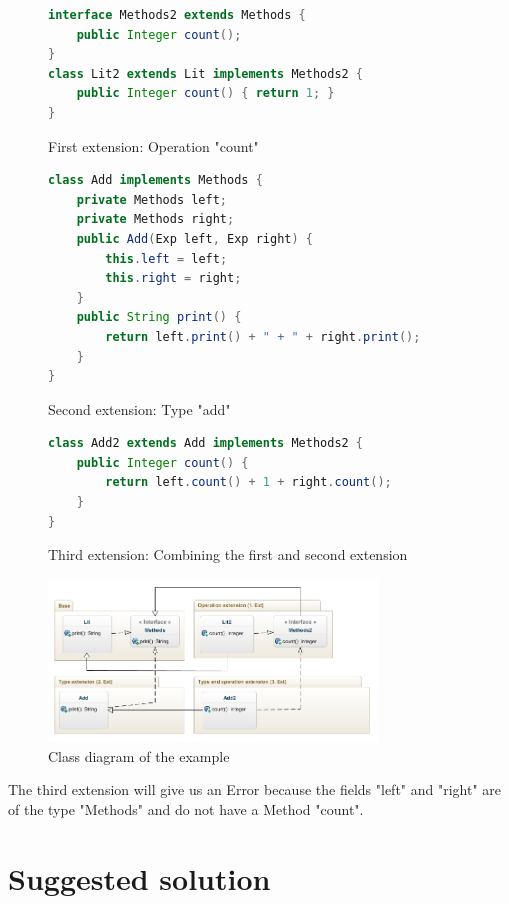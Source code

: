 \documentclass{report}
\begin{document}
\begin{figure}[h]
\begin{lstlisting}[language=java]
interface Methods2 extends Methods {
    public Integer count();
}
class Lit2 extends Lit implements Methods2 {
    public Integer count() { return 1; }
}
\end{lstlisting}
\caption{First extension: Operation "count"}
\label{exampleFirstExtension}
\end{figure}
\begin{figure}[h]
\begin{lstlisting}[language=java]
class Add implements Methods {
    private Methods left;
    private Methods right;
    public Add(Exp left, Exp right) {
        this.left = left;
        this.right = right;
    }
    public String print() {
        return left.print() + " + " + right.print();
    }
}
\end{lstlisting}
\caption{Second extension: Type "add"}
\label{exampleSecondExtension}
\end{figure}
\begin{figure}[h]
\begin{lstlisting}[language=java]
class Add2 extends Add implements Methods2 {
    public Integer count() {
        return left.count() + 1 + right.count();
    }
}
\end{lstlisting}
\caption{Third extension: Combining the first and second extension}
\label{exampleThirdExtension}
\end{figure}

\begin{figure}[h]

\includegraphics[width=330px,keepaspectratio=true]{Expression_problem-diag.jpg}

\caption{Class diagram of the example}
\label{exampleClassDiagram}
\end{figure}

The third extension will give us an Error because the fields "left" and "right" are of the type "Methods" and do not have a Method "count".

\section{Suggested solution}
\label{suggestedEPSolution}
\end{document}
